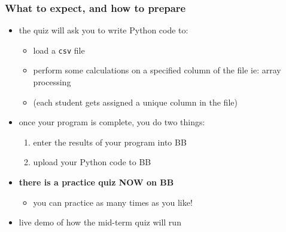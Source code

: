 \documentclass[english,14pt]{beamer}
\begin{document}

\begin{frame}[fragile]

\frametitle{What to expect, and how to prepare}

\begin{itemize}
	\item the quiz will ask you to write Python code to:
	\begin{itemize}
		\item load a \texttt{csv} file
		\item perform some calculations on a specified column of the file ie: array processing
		\item[] (each student gets assigned a unique column in the file)
	\end{itemize}
	\item once your program is complete, you do two things:
	\begin{enumerate}
		\item enter the results of your program into BB
		\item upload your Python code to BB
	\end{enumerate}

	\item \textbf{there is a practice quiz NOW on BB}
	\begin{itemize}
		\item you can practice as many times as you like!
	\end{itemize}
	\item live demo of how the mid-term quiz will run
\end{itemize}

\end{frame}

\end{document}
